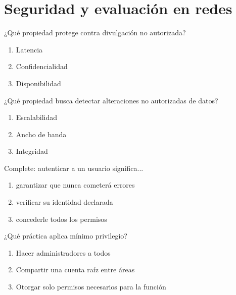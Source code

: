\section{Seguridad y evaluación en redes}

\noindent\begin{minipage}{\linewidth}\setlength{\parskip}{4pt}\label{q:R-060}
¿Qué propiedad protege contra divulgación no autorizada?
\begin{enumerate}[label=\Alph*),nosep]
\item Latencia
\item Confidencialidad
\item Disponibilidad
\end{enumerate}\end{minipage}\par\medskip

\noindent\begin{minipage}{\linewidth}\setlength{\parskip}{4pt}\label{q:R-061}
¿Qué propiedad busca detectar alteraciones no autorizadas de datos?
\begin{enumerate}[label=\Alph*),nosep]
\item Escalabilidad
\item Ancho de banda
\item Integridad
\end{enumerate}\end{minipage}\par\medskip

\noindent\begin{minipage}{\linewidth}\setlength{\parskip}{4pt}\label{q:R-062}
Complete: autenticar a un usuario significa...
\begin{enumerate}[label=\Alph*),nosep]
\item garantizar que nunca cometerá errores
\item verificar su identidad declarada
\item concederle todos los permisos
\end{enumerate}\end{minipage}\par\medskip

\noindent\begin{minipage}{\linewidth}\setlength{\parskip}{4pt}\label{q:R-063}
¿Qué práctica aplica mínimo privilegio?
\begin{enumerate}[label=\Alph*),nosep]
\item Hacer administradores a todos
\item Compartir una cuenta raíz entre áreas
\item Otorgar solo permisos necesarios para la función
\end{enumerate}\end{minipage}\par\medskip

